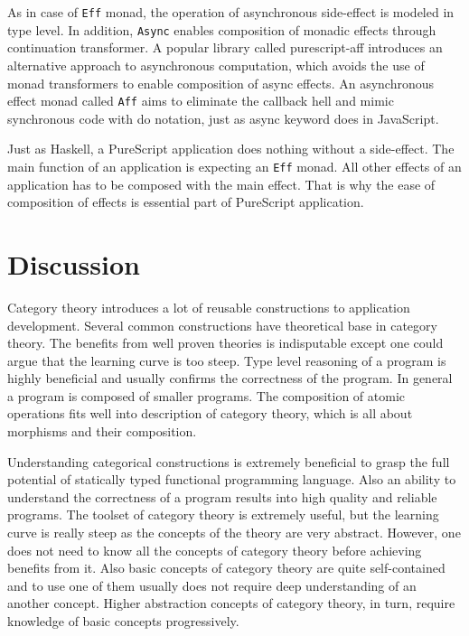 \documentclass[article]{aaltoseries}
\begin{document}
      As in case of \lstinline|Eff| monad, the operation of asynchronous side-effect is
      modeled in type level. In addition, \lstinline|Async| enables composition of monadic
      effects through continuation transformer. A popular library called
      purescript-aff introduces an alternative approach to asynchronous
      computation, which avoids the use of monad transformers to enable
      composition of async effects. An asynchronous effect monad called \lstinline|Aff| aims
      to eliminate the callback hell and mimic synchronous code with do
      notation, just as async keyword does in JavaScript.
 
      Just as Haskell, a PureScript application does nothing without a
      side-effect. The main function of an application is expecting an \lstinline|Eff|
      monad. All other effects of an application has to be composed with the
      main effect. That is why the ease of composition of effects is essential
      part of PureScript application.


\section{Discussion}

Category theory introduces a lot of reusable constructions to application
development. Several common constructions have theoretical base in category
theory. The benefits from well proven theories is indisputable except one could
argue that the learning curve is too steep. Type level reasoning of a program is
highly beneficial and usually confirms the correctness of the program. In
general a program is composed of smaller programs. The composition of atomic
operations fits well into description of category theory, which is all about
morphisms and their composition.
 
Understanding categorical constructions is extremely beneficial to grasp the
full potential of statically typed functional programming language. Also an
ability to understand the correctness of a program results into high quality and
reliable programs. The toolset of category theory is extremely useful, but the
learning curve is really steep as the concepts of the theory are very abstract.
However, one does not need to know all the concepts of category theory before
achieving benefits from it. Also basic concepts of category theory are quite
self-contained and to use one of them usually does not require deep
understanding of an another concept. Higher abstraction concepts of category
theory, in turn, require knowledge of basic concepts progressively.
 
\end{document}
